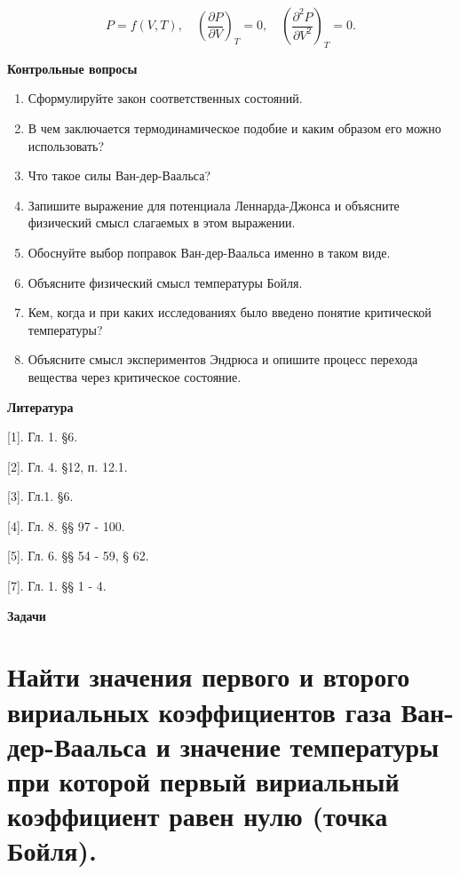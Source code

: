 \begin{equation}
  P = f (V, T), \quad \left (\frac{\partial P}{\partial V} \right )_T = 0,\quad \left (\frac{\partial^2P}{\partial V^2} \right )_T =0.
\end{equation}

\textbf{Контрольные вопросы}

\begin{enumerate}
\def\labelenumi{\arabic{enumi}.}
\item Сформулируйте закон соответственных состояний.
\item В чем заключается термодинамическое подобие и каким образом его можно
  использовать?
\item Что такое силы Ван-дер-Ваальса?
\item
  Запишите выражение для потенциала Леннарда-Джонса и объясните
  физический смысл слагаемых в этом выражении.
\item
  Обоснуйте выбор поправок Ван-дер-Ваальса именно в таком виде.
\item
  Объясните физический смысл температуры Бойля.
\item
  Кем, когда и при каких исследованиях было введено понятие критической
  температуры?
\item
  Объясните смысл экспериментов Эндрюса и опишите процесс перехода
  вещества через критическое состояние.
\end{enumerate}

\textbf{Литература}

{[}1{]}. Гл. 1. §6.

{[}2{]}. Гл. 4. §12, п. 12.1.

{[}3{]}. Гл.1. §6.

{[}4{]}. Гл. 8. §§ 97 - 100.

{[}5{]}. Гл. 6. §§ 54 - 59, § 62.

{[}7{]}. Гл. 1. §§ 1 - 4.

\textbf{Задачи}

\section{Найти значения первого и второго вириальных коэффициентов
газа Ван-дер-Ваальса и значение температуры при которой первый
вириальный коэффициент равен нулю (точка Бойля).}

\solving{}

